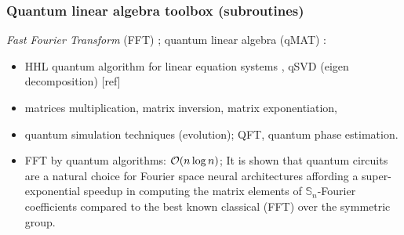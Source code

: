 \subsubsection{Quantum linear algebra toolbox (subroutines)}
\cite{sornsaengQuantumDiffusionMap2021}
\emph{Fast Fourier Transform}  (FFT) \cite{kondorGraphletSpectrum2009};
quantum linear algebra (qMAT) \cite{zhaoCompilingBasicLinear2019}: 
\begin{itemize}
	\item HHL quantum algorithm for linear equation systems \cite{harrowQuantumAlgorithmSolving2009}, qSVD (eigen decomposition) [ref]
	\item matrices multiplication, matrix inversion, matrix exponentiation, 
	\item quantum simulation techniques (evolution); QFT, quantum phase estimation.
	\item FFT by quantum algorithms: $\mathcal{O}(n\log n)$; 
	It is shown that quantum circuits are a natural choice for Fourier space neural architectures affording a super-exponential speedup in computing the matrix elements of $\mathbb{S}_n$-Fourier coefficients compared to the best known classical (FFT) over the symmetric group. \cite{zhengSpeedingLearningQuantum2022}
\end{itemize}


